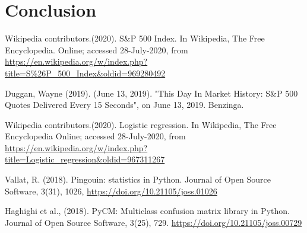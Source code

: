 \documentclass[12pt]{article}
\begin{document}
\begin{table}[h!]
\caption{Pearson Correlation between Volume and Year}
\label{table_4}
\end{table}







\section{Conclusion}



\begin{thebibliography}{999}

	Wikipedia contributors.(2020). S\&P 500 Index. In Wikipedia, The Free Encyclopedia. Online; accessed 28-July-2020, from {\url{https://en.wikipedia.org/w/index.php?title=S\%26P_500_Index&oldid=969280492}}
	
	Duggan, Wayne (2019). (June 13, 2019). "This Day In Market History: S\&P 500 Quotes Delivered Every 15 Seconds", on June 13, 2019. Benzinga.
	
	Wikipedia contributors.(2020). Logistic regression. In Wikipedia, The Free Encyclopedia Online; accessed 28-July-2020, from  {\url{https://en.wikipedia.org/w/index.php?title=Logistic\_regression\&oldid=967311267}}
	
	Vallat, R. (2018). Pingouin: statistics in Python. Journal of Open Source Software, 3(31), 1026, {\url{https://doi.org/10.21105/joss.01026}}
	
	Haghighi et al., (2018). PyCM: Multiclass confusion matrix library in Python. Journal of Open Source Software, 3(25), 729.
	{\url{https://doi.org/10.21105/joss.00729}}
\end{thebibliography}
\end{document}
